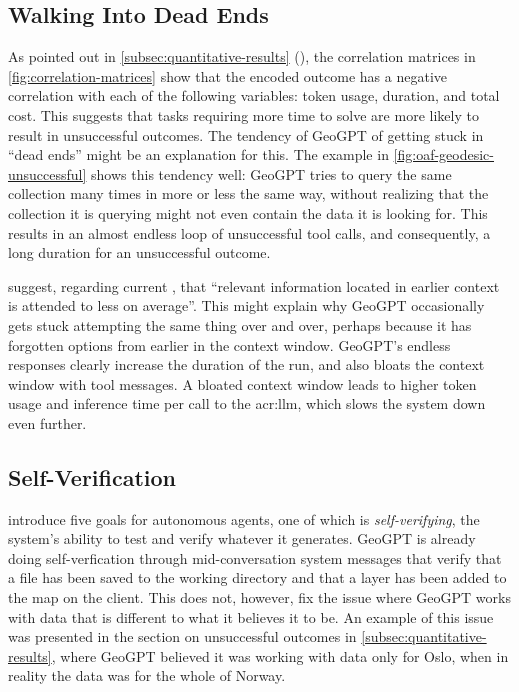 \subsection[Walking Into Dead Ends]{Walking Into Dead Ends}
\label{subsec:dead-ends}

As pointed out in \autoref{subsec:quantitative-results} (), the correlation matrices in \autoref{fig:correlation-matrices} show that the encoded outcome has a negative correlation with each of the following variables: token usage, duration, and total cost. This suggests that tasks requiring more time to solve are more likely to result in unsuccessful outcomes. The tendency of GeoGPT of getting stuck in \enquote{dead ends} might be an explanation for this. The example in \autoref{fig:oaf-geodesic-unsuccessful} shows this tendency well: GeoGPT tries to query the same collection many times in more or less the same way, without realizing that the collection it is querying might not even contain the data it is looking for. This results in an almost endless loop of unsuccessful tool calls, and consequently, a long duration for an unsuccessful outcome.

\cite{peysakhovichAttentionSortingCombats2023} suggest, regarding current , that \enquote{relevant information located in earlier context is attended to less on average}. This might explain why GeoGPT occasionally gets stuck attempting the same thing over and over, perhaps because it has forgotten options from earlier in the context window. GeoGPT's endless responses clearly increase the duration of the run, and also bloats the context window with tool messages. A bloated context window leads to higher token usage and inference time per call to the \acrshort{acr:llm}, which slows the system down even further.


\subsection{Self-Verification}
\label{subsec:self-verification}

\cite{liAutonomousGISNextgeneration2023} introduce five goals for autonomous agents, one of which is \textit{self-verifying}, the system's ability to test and verify whatever it generates. GeoGPT is already doing self-verfication through mid-conversation system messages that verify that a file has been saved to the working directory and that a layer has been added to the map on the client. This does not, however, fix the issue where GeoGPT works with data that is different to what it believes it to be. An example of this issue was presented in the section on unsuccessful outcomes in \autoref{subsec:quantitative-results}, where GeoGPT believed it was working with data only for Oslo, when in reality the data was for the whole of Norway.

